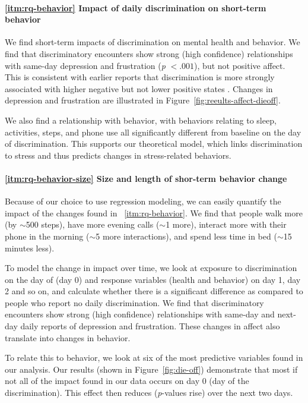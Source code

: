 \paragraph{\ref{itm:rq-behavior} Impact of daily discrimination on short-term behavior} We find short-term impacts of discrimination on mental health and behavior. We find that discriminatory encounters show strong (high confidence) relationships with same-day depression and frustration (\textit{p} $<.001$), but not positive affect. This is consistent with earlier reports that discrimination is more strongly associated with higher negative but not lower positive states \citep{Schmitt:2014}. Changes in depression and frustration are illustrated in Figure~\ref{fig:reeults-affect-dieoff}.  

We also find a relationship with behavior, with behaviors relating to sleep, activities, steps, and phone use all significantly different from baseline on the day of discrimination. This supports our theoretical model, which links discrimination to stress and thus predicts changes in stress-related behaviors. 

\paragraph{\ref{itm:rq-behavior-size} Size and length of shor-term behavior change}

Because of our choice to use regression modeling, we can easily quantify the impact of the changes found in ~\ref{itm:rq-behavior}. We find that people walk more (by $\sim$500 steps), have more evening calls ($\sim$1 more), interact more with their phone in the morning ($\sim$5 more interactions), and spend less time in bed ($\sim$15 minutes less). 

To model the change in impact over time, we look at exposure to discrimination on the day of (day 0) and response variables (health and behavior) on day 1, day 2 and so on, and calculate whether there is a significant difference as compared to people who report no daily discrimination.  We find that discriminatory encounters show strong (high confidence) relationships with same-day and next-day daily reports of depression and frustration. These changes in affect also translate into changes in behavior.

To relate this to behavior, we look at six of the most predictive variables found in our analysis. Our results (shown in Figure~\ref{fig:die-off}) demonstrate that most if not all of the impact found in our data occurs on  day 0 (day of the discrimination). This effect then reduces (\textit{p}-values rise) over the next two days. 

